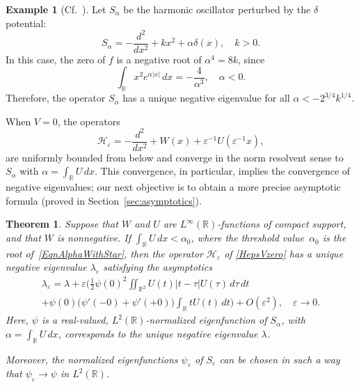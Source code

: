 \documentclass[reqno]{amsart}
\newtheorem{thm}{Theorem}
\theoremstyle{definition}
\newtheorem{exm}{Example}
\theoremstyle{remark}
\numberwithin{equation}{section}
\newcommand{\Real}{\mathbb R}
\newcommand{\eps}{\varepsilon}
\newcommand{\cH}{\mathcal{H}}
\begin{document}
\begin{exm}[{Cf.~\cite{Avakian87,FassariInglese94}}]\rm	Let $S_\alpha$ be the harmonic oscillator perturbed by the $\delta$ potential:
\begin{equation*}
  S_\alpha = -\frac{d^2}{dx^2} + kx^2 + \alpha\delta(x), \quad k>0.
\end{equation*}
In this case, the zero of $f$ is a negative root of $\alpha^4=8k$, since
\begin{equation*}
	\int_\Real  x^2 e^{\alpha |x|}\,dx=-\frac{4}{\alpha^3},\quad \alpha<0.
\end{equation*}
Therefore, the operator $S_\alpha$ has a unique negative eigenvalue  for all $\alpha<-2^{3/4}k^{1/4}$.
\end{exm}

When $V=0$, the operators
\begin{equation}\label{HepsVzero}
	\cH_\eps = -\frac{d^2}{dx^2} + W(x) + \eps^{-1} U(\eps^{-1}x),
\end{equation}
are uniformly bounded from below and converge in the norm resolvent sense to~$S_\alpha$ with
$\alpha=\int_{\Real}U\,dx$. This convergence, in particular, implies the convergence of negative eigenvalues; our next objective is to obtain a more precise asymptotic formula (proved in Section~\ref{sec:asymptotics}).

%
\begin{thm}\label{TheoremDelta}
    Suppose that $W$ and $U$ are $L^\infty(\Real)$-functions of compact support, and that $W$ is nonnegative. If $\int_{\Real}U\,dx<\alpha_0$, where the threshold value~$\alpha_0$ is the root of~\eqref{EqnAlphaWithStar}, then the operator $\cH_\eps$ of \eqref{HepsVzero}
	has a unique negative eigenvalue $\lambda_\eps$ satisfying the asymptotics
	\begin{multline}\label{DeltaBoundStateAsymp}
		\lambda_\eps=\lambda+\eps \bigg(\frac12\psi(0)^2\iint_{\Real^2} U(t)|t-\tau|U(\tau)\,d\tau\,dt
		\\
		+ \psi(0)\big(\psi'(-0)+\psi'(+0)\big)\int_{\Real} t U(t)\,dt\bigg)+O(\eps^2),\quad \eps\to 0.
	\end{multline}
	Here, $\psi$ is a real-valued, $L^2(\Real)$-normalized eigenfunction of $S_\alpha$, with $\alpha=\int_{\Real}U\,dx$, corresponds to the unique negative eigenvalue $\lambda$.

	Moreover, the normalized eigenfunctions $\psi_\eps$ of $S_\eps$ can be chosen in such a way that
	$\psi_\eps\to \psi$ in $L^2(\Real)$.
\end{thm}
%
\end{document}
